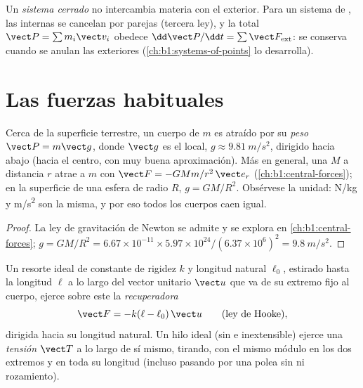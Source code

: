 \begin{definition}\label{def:b1:newton-dynamics:conservation}
Un \emph{sistema cerrado} no intercambia materia con el exterior. Para un
sistema de , las  internas se cancelan por parejas
(tercera ley), y la  total $\vect P = \sum m_i\vect v_i$
obedece $\dd\vect P/\dd t = \sum\vect F_{\mathrm{ext}}$: se conserva cuando
se anulan las  exteriores (\cref{ch:b1:systems-of-points} lo
desarrolla).
\end{definition}

\section{Las fuerzas habituales}

\begin{proposition}\label{prop:b1:newton-dynamics:weight}
Cerca de la superficie terrestre, un cuerpo de  $m$ es atraído por su
\emph{peso} $\vect P = m\vect g$, donde $\vect g$ es el 
local, $g \approx \qty{9.81}{m/s^2}$, dirigido hacia abajo (hacia el
centro, con muy buena aproximación). Más en general, una  $M$ a
distancia $r$ atrae a $m$ con $\vect F = -GMm/r^2\,\vect e_r$
(\cref{ch:b1:central-forces}); en la superficie de una esfera de radio
$R$, $g = GM/R^2$. Obsérvese la unidad: \unit{N/kg} y \unit{m/s^2} son la
misma, y por eso todos los cuerpos caen igual.
\end{proposition}

\begin{proof}
La ley de gravitación de Newton se admite y se explora en
\cref{ch:b1:central-forces}; $g = GM/R^2 = 6.67\times10^{-11} \times
5.97\times10^{24}/(6.37\times10^6)^2 = \qty{9.8}{m/s^2}$.
\end{proof}

\begin{proposition}\label{prop:b1:newton-dynamics:springstring}
Un resorte ideal de constante de rigidez $k$ y longitud natural $\ell_0$,
estirado hasta la longitud $\ell$ a lo largo del vector unitario $\vect u$
que va de su extremo fijo al cuerpo, ejerce sobre este la \emph{ recuperadora}
\[
\vect F = -k(\ell - \ell_0)\,\vect u \qquad (\text{ley de Hooke}),
\]
dirigida hacia su longitud natural. Un hilo ideal (sin  e
inextensible) ejerce una \emph{tensión} $\vect T$ a lo largo de sí mismo,
tirando, con el mismo módulo en los dos extremos y en toda su longitud
(incluso pasando por una polea sin  ni rozamiento).
\end{proposition}

